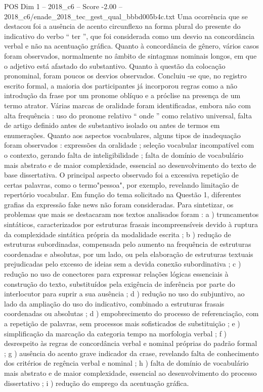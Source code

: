 \begin{textsample}{POS Dim 1 – 2018\_c6 – Score -2.00 – 2018\_c6/enade\_2018\_tec\_gest\_qual\_bbbd005b4c.txt}
Uma ocorrência que se destacou foi a ausência de acento circunflexo na forma plural do presente do indicativo do verbo “ ter ”, que foi considerada como um desvio na concordância verbal e não na acentuação gráfica.
Quanto à concordância de gênero, vários casos foram observados, normalmente no âmbito de sintagmas nominais longos, em que o adjetivo está afastado do substantivo.
Quanto à questão da colocação pronominal, foram poucos os desvios observados.
Concluiu -se que, no registro escrito formal, a maioria dos participantes já incorporou regras como a não introdução da frase por um pronome oblíquo e a próclise na presença de um termo atrator.
Várias marcas de oralidade foram identificadas, embora não com alta frequência : uso do pronome relativo “ onde ” como relativo universal, falta de artigo definido antes de substantivo isolado ou antes de termos em enumerações.
Quanto aos aspectos vocabulares, alguns tipos de inadequação foram observados : expressões da oralidade ; seleção vocabular incompatível com o contexto, gerando falta de inteligibilidade ; falta de domínio de vocabulário mais abstrato e de maior complexidade, essencial ao desenvolvimento do texto de base dissertativa.
O principal aspecto observado foi a excessiva repetição de certas palavras, como o termo"pessoa", por exemplo, revelando limitação de repertório vocabular.
Em função do tema solicitado na Questão 1, diferentes grafias da expressão fake news não foram consideradas.
Para sintetizar, os problemas que mais se destacaram nos textos analisados foram : a ) truncamentos sintáticos, caracterizados por estruturas frasais incompreensíveis devido à ruptura da complexidade sintática própria da modalidade escrita ; b ) redução de estruturas subordinadas, compensada pelo aumento na frequência de estruturas coordenadas e absolutas, por um lado, ou pela elaboração de estruturas textuais prejudicadas pelo excesso de ideias sem a devida conexão subordinativa ; c ) redução no uso de conectores para expressar relações lógicas essenciais à construção do texto, substituídos pela exigência de inferência por parte do interlocutor para suprir a sua ausência ; d ) redução no uso do subjuntivo, ao lado da ampliação do uso do indicativo, combinado a estruturas frasais coordenadas ou absolutas ; d ) empobrecimento do processo de referenciação, com a repetição de palavras, sem processos mais sofisticados de substituição ; e ) simplificação da marcação da categoria tempo na morfologia verbal ; f ) desrespeito às regras de concordância verbal e nominal próprias do padrão formal ; g ) ausência do acento grave indicador da crase, revelando falta de conhecimento dos critérios de regência verbal e nominal ; h ) falta de domínio de vocabulário mais abstrato e de maior complexidade, essencial ao desenvolvimento do processo dissertativo ; i ) redução do emprego da acentuação gráfica.

\end{textsample}
